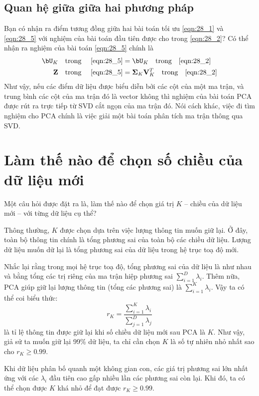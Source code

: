  
\subsection{Quan hệ giữa giữa hai phương pháp}
Bạn có nhận ra điểm tương đồng giữa hai bài toán tối ưu \eqref{eqn:28_1} và \eqref{eqn:28_5} với nghiệm của bài toán đầu tiên được cho trong \eqref{eqn:28_2}? Có thể nhận ra nghiệm của bài toán \eqref{eqn:28_5} chính là
\begin{align*} 
  \bU_K \quad \text{trong}\quad~\eqref{eqn:28_5} &= \bU_K \quad\text{trong} \quad
  \eqref{eqn:28_2} \\\ 
  \mathbf{Z} \quad\text{trong}\quad~\eqref{eqn:28_5} &= \mathbf{\Sigma}_K \mathbf{V}_K^T \quad\text{trong} \quad \eqref{eqn:28_2} 
\end{align*} 
Như vậy, nếu các điểm dữ liệu được biểu diễn bởi các cột của một ma trận, và
trung bình các cột của ma trận đó là vector không thì nghiệm của bài toán PCA được rút ra trực tiếp từ SVD cắt ngọn của 
ma trận đó. Nói cách khác, việc đi tìm nghiệm cho PCA chính là việc giải một
bài toán phân tích ma trận thông qua SVD.
 
 
\section{Làm thế nào để chọn số chiều của dữ liệu mới}
 
Một câu hỏi được đặt ra là, làm thế nào để chọn giá trị $K$  --  chiều của dữ
liệu mới  --  với từng dữ liệu cụ thể? 
 
Thông thường, $K$ được chọn dựa trên việc {lượng thông tin muốn giữ lại}. Ở đây, toàn bộ thông tin chính là tổng phương sai của toàn bộ các chiều dữ liệu. Lượng dữ liệu muốn dữ lại là tổng phương sai của dữ liệu trong hệ trục toạ độ mới. 
 
 Nhắc lại rằng trong mọi hệ trục toạ độ, tổng phương sai của dữ liệu là như nhau
 và bằng tổng các trị riêng của ma trận hiệp phương sai $\sum_{i=1}^D
 \lambda_i$. Thêm nữa, PCA giúp giữ lại lượng thông tin (tổng các phương sai) là
 $\sum_{i=1}^K \lambda_i$. Vậy ta có thể coi biểu thức:
\begin{equation} 
 \label{eqn:28_6}
   r_K = \frac{\sum_{i=1}^K \lambda_i}{\sum_{j=1}^D \lambda_j} 
\end{equation} 
là tỉ lệ thông tin được giữ lại khi số chiều dữ liệu mới sau PCA là $K$. Như
 vậy, giả sử ta muốn giữ lại 99\% dữ liệu, ta chỉ cần chọn $K$ là số tự nhiên
 nhỏ nhất sao cho $r_K \geq 0.99$.
 
Khi dữ liệu phân bố quanh một không gian con, các giá trị phương sai lớn nhất
ứng với các $\lambda_i$ đầu tiên cao gấp nhiều lần các phương sai còn lại.
Khi đó, ta có thể chọn được $K$ khá nhỏ để đạt được $r_K \geq 0.99$.
 
